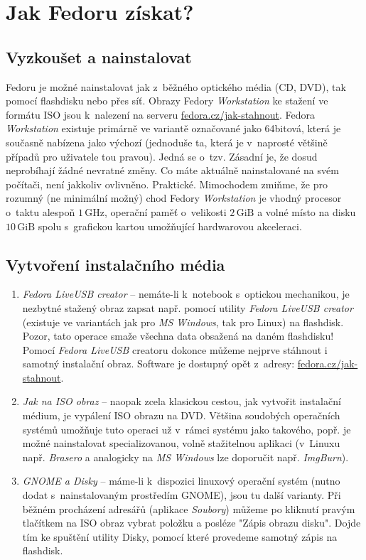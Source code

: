 \chapter*{Jak Fedoru získat?}

\section*{Vyzkoušet a nainstalovat}
Fedoru je možné nainstalovat jak z~běžného optického média (CD, DVD), tak pomocí flashdisku nebo přes síť. Obrazy Fedory \emph{Workstation} ke stažení ve formátu ISO jsou k~nalezení na serveru \url{fedora.cz/jak-stahnout}. Fedora \emph{Workstation} existuje primárně ve variantě označované jako 64bitová, která je současně nabízena jako výchozí (jednoduše ta, která je v~naprosté většině případů pro uživatele tou pravou). Jedná se o~tzv.  Zásadní je, že dosud neprobíhají žádné nevratné změny. Co máte aktuálně nainstalované na svém počítači, není jakkoliv ovlivněno. Praktické. Mimochodem zmiňme, že pro rozumný (ne minimální možný) chod Fedory \emph{Workstation} je vhodný procesor o~taktu alespoň $1\,\mathrm{GHz}$, operační paměť o~velikosti $2\,\mathrm{GiB}$ a volné místo na disku $10\,\mathrm{GiB}$ spolu s~grafickou kartou umožňující hardwarovou akceleraci.

\section*{Vytvoření instalačního média}
\begin{enumerate}

\item\emph{Fedora LiveUSB creator} -- nemáte-li k~notebook s~optickou mechanikou, je nezbytné stažený obraz zapsat např. pomocí utility \emph{Fedora LiveUSB creator} (existuje ve variantách jak pro \emph{MS Windows}, tak pro Linux) na flashdisk. Pozor, tato operace smaže všechna data obsažená na daném flashdisku! Pomocí \emph{Fedora LiveUSB} creatoru dokonce můžeme nejprve stáhnout i samotný instalační obraz. Software je dostupný opět z~adresy: \url{fedora.cz/jak-stahnout}.

\item\emph{Jak na ISO obraz} -- naopak zcela klasickou cestou, jak vytvořit instalační médium, je vypálení ISO obrazu na DVD. Většina soudobých operačních systémů umožňuje tuto operaci už v~rámci systému jako takového, popř. je možné nainstalovat specializovanou, volně stažitelnou aplikaci (v~Linuxu např. \emph{Brasero} a analogicky na \emph{MS Windows} lze doporučit např. \emph{ImgBurn}).

\item\emph{GNOME a Disky} -- máme-li k~dispozici linuxový operační systém (nutno dodat s~nainstalovaným prostředím GNOME), jsou tu další varianty. Při běžném procházení adresářů (aplikace \emph{Soubory}) můžeme po kliknutí pravým tlačítkem na ISO obraz vybrat položku  a posléze "Zápis obrazu disku". Dojde tím ke spuštění utility Disky, pomocí které provedeme samotný zápis na flashdisk.
\end{enumerate}

